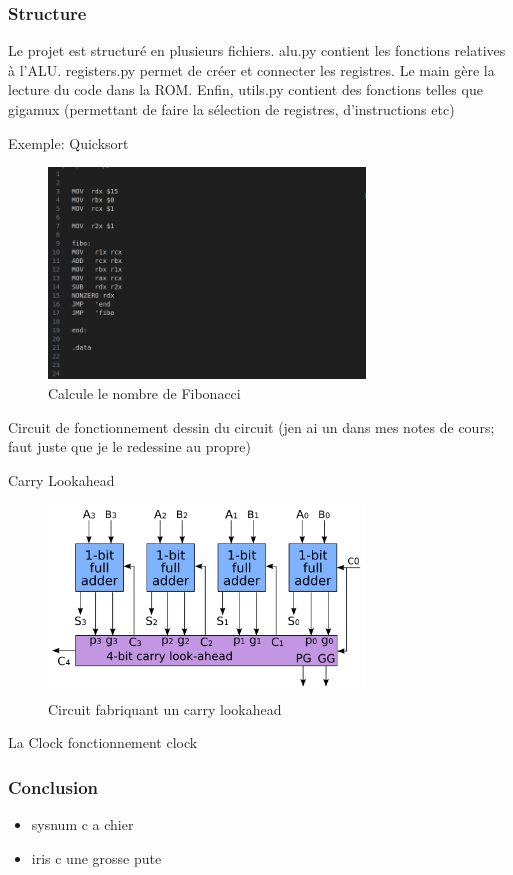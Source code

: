 \documentclass[12pt]{beamer}
\begin{document}
\begin{frame}
\frametitle{Structure}
   
   Le projet est structuré en plusieurs fichiers. alu.py contient les fonctions relatives à 
   l'ALU. registers.py permet de créer et connecter les registres. Le main gère la lecture du code
   dans la ROM. Enfin, utils.py contient des fonctions telles que gigamux (permettant de faire la sélection
   de registres, d'instructions etc)
\end{frame}

\begin{frame}{Exemple: Quicksort}
    \begin{figure}
        \centering
            \includegraphics[width=0.75\textwidth]{Fib.png}
            \caption{Calcule le nombre de Fibonacci}
            \label{fig:question}
        \end{figure}
\end{frame}


\begin{frame}{Circuit de fonctionnement}
    dessin du circuit (jen ai un dans mes notes de cours; faut juste que je le redessine au propre)
\end{frame}


\begin{frame}{Carry Lookahead}
    \begin{figure}
        \centering
            \includegraphics[width=0.75\textwidth]{carry.png}
            \caption{Circuit fabriquant un carry lookahead}
            \label{fig:question}
        \end{figure}
\end{frame}

\begin{frame}{La Clock}
    fonctionnement clock
\end{frame}
    
\begin{frame}
\frametitle{Conclusion}
\begin{itemize}
    \item sysnum c a chier
    \item iris c une grosse pute
\end{itemize}
\end{frame}
\end{document}
